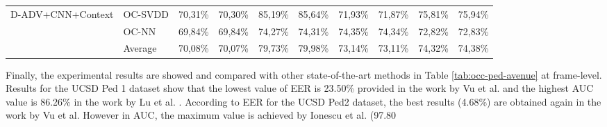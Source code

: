 \begin{table}
\begin{tabular}{|c|l|r|r|r|r|r|r|r|r|}
    \hline
    \multirow{3}{*}{D-ADV+CNN+Context} & OC-SVDD & 70,31\% & 70,30\% & 85,19\% & 85,64\% & 71,93\% & 71,87\% & 75,81\% & 75,94\% \bigstrut\\
\cline{2-10}          & OC-NN & 69,84\% & 69,84\% & 74,27\% & 74,31\% & 74,35\% & 74,34\% & 72,82\% & 72,83\% \bigstrut\\
\cline{2-10}          & Average & 70,08\% & 70,07\% & 79,73\% & 79,98\% & 73,14\% & 73,11\% & 74,32\% & 74,38\% \bigstrut\\
    \hline
    \end{tabular}%
  \label{tab:d-adv-oc}%
\end{table}%


Finally, the experimental results are showed and compared with other state-of-the-art methods in Table \ref{tab:occ-ped-avenue} at frame-level. Results for the UCSD Ped 1 dataset show that the lowest value of EER is 23.50\% provided in the work by Vu et al. \cite{vu2019robust} and the highest AUC value is 86.26\% in the work by Lu et al. \cite{lu2019future}. According to EER for the UCSD Ped2 dataset, the best results (4.68\%) are obtained again in the work by Vu et al. However in AUC, the maximum value is achieved by Ionescu et al. \cite{ionescu2019object} (97.80%

